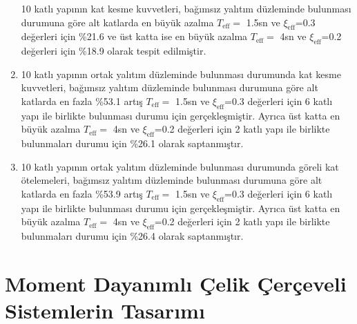 \begin{enumerate}
10 katlı yapının kat kesme kuvvetleri, bağımsız yalıtım düzleminde
bulunması durumuna göre alt katlarda en büyük azalma $T_{\text{eff}}=$
1.5sn ve $\xi_{\text{eff}}$=0.3 değerleri için \%21.6 ve üst katta
ise en büyük azalma $T_{\text{eff}}=$ 4sn ve $\xi_{\text{eff}}$=0.2
değerleri için \%18.9 olarak tespit edilmiştir.
\item 10 katlı yapının ortak yalıtım düzleminde bulunması durumunda kat
kesme kuvvetleri, bağımsız yalıtım düzleminde bulunması durumuna göre
alt katlarda en fazla \%53.1 artış $T_{\text{eff}}=$ 1.5sn ve $\xi_{\text{eff}}$=0.3
değerleri için 6 katlı yapı ile birlikte bulunması durumu için gerçekleşmiştir.
Ayrıca üst katta en büyük azalma $T_{\text{eff}}=$ 4sn ve $\xi_{\text{eff}}$=0.2
değerleri için 2 katlı yapı ile birlikte bulunmaları durumu için \%26.1
olarak saptanmıştır.
\item 10 katlı yapının ortak yalıtım düzleminde bulunması durumunda göreli
kat ötelemeleri, bağımsız yalıtım düzleminde bulunması durumuna göre
alt katlarda en fazla \%53.9 artış $T_{\text{eff}}=$ 1.5sn ve $\xi_{\text{eff}}$=0.3
değerleri için 6 katlı yapı ile birlikte bulunması durumu için gerçekleşmiştir.
Ayrıca üst katta en büyük azalma $T_{\text{eff}}=$ 4sn ve $\xi_{\text{eff}}$=0.2
değerleri için 2 katlı yapı ile birlikte bulunmaları durumu için \%26.4
olarak saptanmıştır. 
\end{enumerate}

\section{Moment Dayanımlı Çelik Çerçeveli Sistemlerin Tasarımı}

